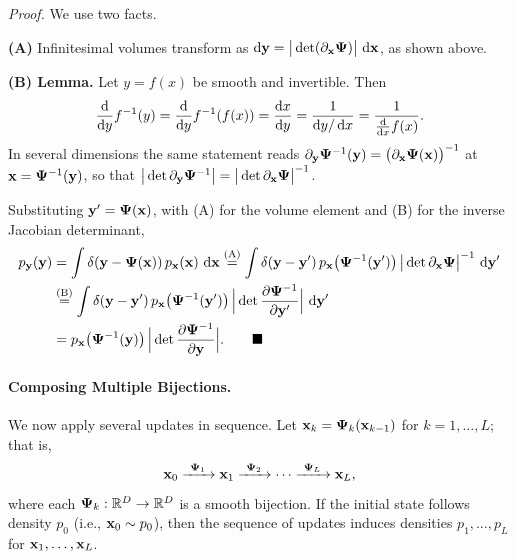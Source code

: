 \begin{nknote}
\noindent\textit{Proof.} We use two facts.

\smallskip\noindent
\textbf{(A)} Infinitesimal volumes transform as $\mathop{}\!\mathrm{d}{\mathbf{y}} = \big|\det(\partial_{\mathbf{x}}\bm{\Psi})\big|\,\mathop{}\!\mathrm{d}{\mathbf{x}}$, as shown above.

\smallskip\noindent
\textbf{(B) Lemma.} Let $y = f(x)$ be smooth and invertible. Then
\[
\frac{\diff}{\diff y} f^{-1}(y)
= \frac{\diff}{\diff y} f^{-1}(f(x))
= \frac{\diff x}{\diff y}
= \frac{1}{\diff y/\diff x}
= \frac{1}{\frac{\diff}{\diff x} f(x)}.
\]
In several dimensions the same statement reads $\partial_{\mathbf{y}}\bm{\Psi}^{-1}({\mathbf{y}}) = \big(\partial_{\mathbf{x}}\bm{\Psi}({\mathbf{x}})\big)^{-1}$ at ${\mathbf{x}} = \bm{\Psi}^{-1}({\mathbf{y}})$, so that $\big|\det \partial_{\mathbf{y}}\bm{\Psi}^{-1}\big| = \big|\det \partial_{\mathbf{x}}\bm{\Psi}\big|^{-1}$.

\smallskip\noindent
Substituting ${\mathbf{y}}' = \bm{\Psi}({\mathbf{x}})$, with (A) for the volume element and (B) for the inverse Jacobian determinant,
\begin{align*}
p_{{\mathbf{y}}}({\mathbf{y}})
&= \int \delta({\mathbf{y}} - \bm{\Psi}({\mathbf{x}}))\, p_{{\mathbf{x}}}({\mathbf{x}})\,\mathop{}\!\mathrm{d}{\mathbf{x}}
\overset{\text{(A)}}{=} \int \delta({\mathbf{y}} - {\mathbf{y}}')\, p_{{\mathbf{x}}}\big(\bm{\Psi}^{-1}({\mathbf{y}}')\big)\,\big|\det \partial_{\mathbf{x}}\bm{\Psi}\big|^{-1}\,\mathop{}\!\mathrm{d}{\mathbf{y}}' \\
&\overset{\text{(B)}}{=} \int \delta({\mathbf{y}} - {\mathbf{y}}')\, p_{{\mathbf{x}}}\big(\bm{\Psi}^{-1}({\mathbf{y}}')\big)\,\Big|\det \frac{\partial \bm{\Psi}^{-1}}{\partial {\mathbf{y}}'}\Big|\,\mathop{}\!\mathrm{d}{\mathbf{y}}' \\
&= p_{{\mathbf{x}}}\big(\bm{\Psi}^{-1}({\mathbf{y}})\big)\,\Big|\det \frac{\partial \bm{\Psi}^{-1}}{\partial {\mathbf{y}}}\Big|. \hspace{2em}\blacksquare
\end{align*}
\end{nknote}



\paragraph{Composing Multiple Bijections.} We now apply several updates in sequence.  
Let ${\mathbf{x}}_k = \bm{\Psi}_k({\mathbf{x}}_{k-1})$ for $k=1,\dots,L$; that is,
\[
\rvx_0 \xrightarrow{\ \bm{\Psi}_1\ } \rvx_1 \xrightarrow{\ \bm{\Psi}_2\ } \cdots
\xrightarrow{\ \bm{\Psi}_L\ } \rvx_L,
\]
where each $\bm{\Psi}_k:\mathbb{R}^D \to \mathbb{R}^D$ is a smooth bijection.  
If the initial state follows density $p_0$ (i.e., ${\mathbf{x}}_0 \sim p_0$), then the sequence of updates induces densities $p_1,\dots,p_L$ for ${\mathbf{x}}_1,\dots,{\mathbf{x}}_L$.  

